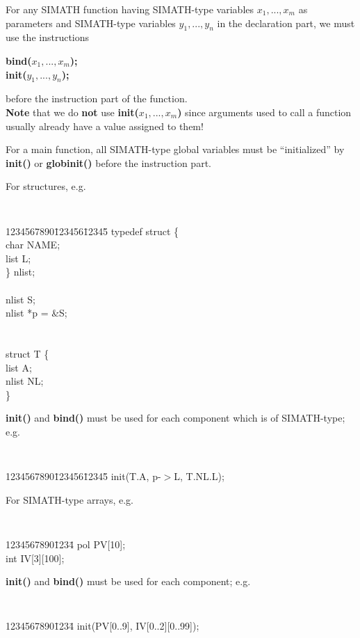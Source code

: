 For any SIMATH function having SIMATH-type variables {\bf $x_1, ..., x_m$}
as pa\-ra\-me\-ters and SIMATH-type variables {\bf $y_1, ..., y_n$} in the declaration
part, we must use the instructions
\begin{center}
{\bf bind($x_1,...,x_m$);} \\
{\bf init($y_1,...,y_n$);}
\end{center}
before the instruction part of the function. \\
{\bf Note} that we do {\bf not} use {\bf init($x_1,...,x_m$)}
since arguments used to call a function usually already have a value assigned to them!

For a main function, all SIMATH-type global variables must be ``initialized'' by
{\bf init()} or {\bf globinit()} before the instruction part.

\newpage

For structures, e.g.
   {\tt
    \begin{tabbing}
    1234567890\=123456\=12345\=\kill
    \>    typedef struct \{ \> \\
    \> \>    char NAME; \\
    \> \>    list L;    \\
    \>   \} nlist; \> \\
    \> \\   
    \>    nlist S;   \> \\
    \>    nlist *p = \&S; \> \\
    \> \\   
    \> \\   
    \>    struct T \{ \> \\
    \> \>   list A; \\
    \> \>   nlist NL; \\
    \>   \} 
    \end{tabbing}  
   }
{\bf init()} and {\bf bind()} must be used for each component which is of
SIMATH-type; e.g.
   {\tt
    \begin{tabbing}
    1234567890\=123456\=12345\=\kill
    \>  init(T.A, p-$>$L, T.NL.L);\> 
    \end{tabbing}  
   }

For SIMATH-type arrays, e.g.
   {\tt 
    \begin{tabbing}
    1234567890\=1234\=\kill
    \>  pol PV[10];\\
    \>  int IV[3][100];
    \end{tabbing}
   }
{\bf init()} and {\bf bind()} must be used for each component; e.g.
   {\tt 
    \begin{tabbing}
    1234567890\=1234\=\kill
    \>  init(PV[0..9], IV[0..2][0..99]);  
    \end{tabbing}
   }

